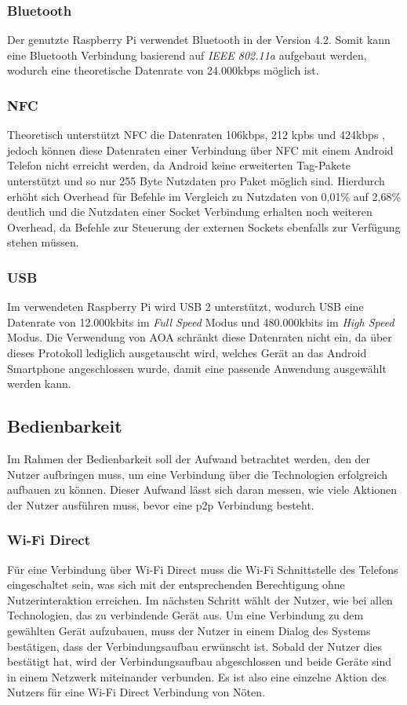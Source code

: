 		\subsubsection{Bluetooth} Der genutzte Raspberry Pi verwendet Bluetooth in der Version 4.2. Somit kann eine Bluetooth Verbindung basierend auf {\it IEEE 802.11a} aufgebaut werden, wodurch eine theoretische Datenrate von 24.000kbps möglich ist.
		
		\subsubsection{NFC} Theoretisch unterstützt NFC die Datenraten 106kbps, 212 kpbs und 424kbps \linebreak \cite{nfcRates}, jedoch können diese Datenraten einer Verbindung über NFC mit einem Android Telefon nicht erreicht werden, da Android keine erweiterten Tag-Pakete unterstützt \cite{nfcBug} und so nur 255 Byte Nutzdaten pro Paket möglich sind. Hierdurch erhöht sich Overhead für Befehle im Vergleich zu Nutzdaten von 0,01\% auf 2,68\% deutlich und die Nutzdaten einer Socket Verbindung erhalten noch weiteren Overhead, da Befehle zur Steuerung der externen Sockets ebenfalls zur Verfügung stehen müssen.
		
		\subsubsection{USB} Im verwendeten Raspberry Pi wird USB 2 unterstützt, wodurch USB eine Datenrate von 12.000kbits im {\it Full Speed} Modus und 480.000kbits im {\it High Speed} Modus. Die Verwendung von AOA schränkt diese Datenraten nicht ein, da über dieses Protokoll lediglich ausgetauscht wird, welches Gerät an das Android Smartphone angeschlossen wurde, damit eine passende Anwendung ausgewählt werden kann.
		
		\subsection{Bedienbarkeit}
      Im Rahmen der Bedienbarkeit soll der Aufwand betrachtet werden, den der Nutzer aufbringen muss, um eine Verbindung über die Technologien erfolgreich aufbauen zu können. Dieser Aufwand lässt sich daran messen, wie viele Aktionen der Nutzer ausführen muss, bevor eine p2p Verbindung besteht.
      
		\subsubsection{Wi-Fi Direct} Für eine Verbindung über Wi-Fi Direct muss die Wi-Fi Schnittstelle des Telefons eingeschaltet sein, was sich mit der entsprechenden Berechtigung ohne Nutzerinteraktion erreichen. Im nächsten Schritt wählt der Nutzer, wie bei allen Technologien, das zu verbindende Gerät aus. Um eine Verbindung zu dem gewählten Gerät aufzubauen, muss der Nutzer in einem Dialog des Systems bestätigen, dass der Verbindungsaufbau erwünscht ist. Sobald der Nutzer dies bestätigt hat, wird der Verbindungsaufbau abgeschlossen und beide Geräte sind in einem Netzwerk miteinander verbunden. Es ist also eine einzelne Aktion des Nutzers für eine Wi-Fi Direct Verbindung von Nöten.
		
